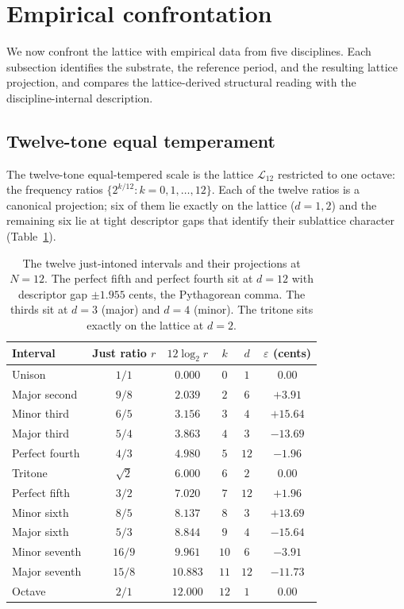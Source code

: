 \documentclass[11pt,a4paper]{article}
\theoremstyle{definition}
\theoremstyle{remark}
\newcommand{\eps}{\varepsilon}
\begin{document}
\section{Empirical confrontation}\label{sec:applications}

We now confront the lattice with empirical data from five disciplines. Each subsection identifies the substrate, the reference period, and the resulting lattice projection, and compares the lattice-derived structural reading with the discipline-internal description.

\subsection{Twelve-tone equal temperament}\label{subsec:temperament}

The twelve-tone equal-tempered scale is the lattice $\mathcal{L}_{12}$ restricted to one octave: the frequency ratios $\{2^{k/12} : k=0,1,\ldots,12\}$. Each of the twelve ratios is a canonical projection; six of them lie exactly on the lattice ($d=1,2$) and the remaining six lie at tight descriptor gaps that identify their sublattice character (Table~\ref{tab:intervals}).

\begin{table}[h]
\centering
\begin{tabular}{@{}l c c c c c@{}}
\toprule
Interval & Just ratio $r$ & $12\log_{2}r$ & $k$ & $d$ & $\eps$ (cents)\\
\midrule
Unison & $1/1$ & $0.000$ & $0$ & $1$ & $0.00$\\
Major second & $9/8$ & $2.039$ & $2$ & $6$ & $+3.91$\\
Minor third & $6/5$ & $3.156$ & $3$ & $4$ & $+15.64$\\
Major third & $5/4$ & $3.863$ & $4$ & $3$ & $-13.69$\\
Perfect fourth & $4/3$ & $4.980$ & $5$ & $12$ & $-1.96$\\
Tritone & $\sqrt{2}$ & $6.000$ & $6$ & $2$ & $0.00$\\
Perfect fifth & $3/2$ & $7.020$ & $7$ & $12$ & $+1.96$\\
Minor sixth & $8/5$ & $8.137$ & $8$ & $3$ & $+13.69$\\
Major sixth & $5/3$ & $8.844$ & $9$ & $4$ & $-15.64$\\
Minor seventh & $16/9$ & $9.961$ & $10$ & $6$ & $-3.91$\\
Major seventh & $15/8$ & $10.883$ & $11$ & $12$ & $-11.73$\\
Octave & $2/1$ & $12.000$ & $12$ & $1$ & $0.00$\\
\bottomrule
\end{tabular}
\caption{The twelve just-intoned intervals and their projections at $N=12$. The perfect fifth and perfect fourth sit at $d=12$ with descriptor gap $\pm 1.955$ cents, the Pythagorean comma. The thirds sit at $d=3$ (major) and $d=4$ (minor). The tritone sits exactly on the lattice at $d=2$.}
\label{tab:intervals}
\end{table}
\end{document}

